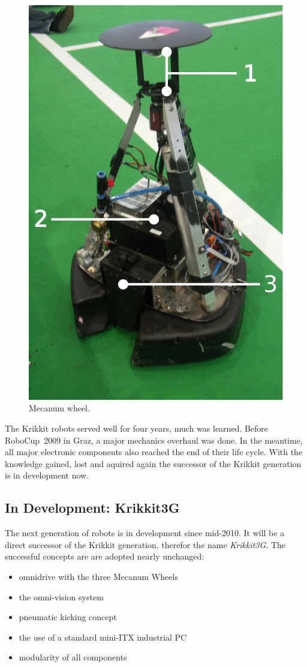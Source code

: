 \documentclass[12pt,a4paper]{article}
\begin{document}
\begin{figure}[ht]
\begin{center}  
\includegraphics[width=0.5\columnwidth]{figures/krikkit}
\caption{\label{fig:mec-wheel}
Mecanum wheel. 
}   
\end{center}
\end{figure}


The Krikkit robots served well for four years, much was learned.
Before RoboCup~2009 in Graz, a major mechanics overhaul was done.
In the meantime, all major electronic components also reached the end of their life cycle.
With the knowledge gained, lost and aquired again the successor of the Krikkit generation is in development now.
    

\subsection{In Development: Krikkit3G}

The next generation of robots is in development since mid-2010.
It will be a direct successor of the Krikkit generation, therefor the name \emph{Krikkit3G}.
The successful concepts are are adopted nearly unchanged:

\begin{itemize}
  \item omnidrive with the three Mecanum Wheels
  \item the omni-vision system
  \item pneumatic kicking concept
  \item the use of a standard mini-ITX industrial PC
  \item modularity of all components
\end{itemize}
\end{document}
